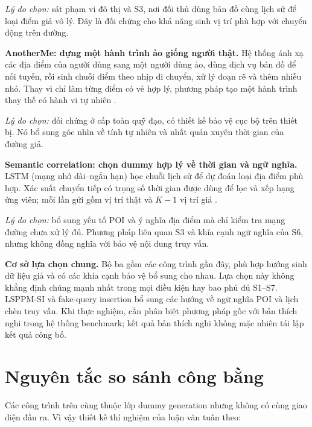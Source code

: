\documentclass[12pt,a4paper,oneside]{report}
\begin{document}
\noindent\emph{Lý do chọn:} sát phạm vi đô thị và S3, nơi đối thủ dùng bản đồ cùng lịch sử để loại điểm giả vô lý. Đây là đối chứng cho khả năng sinh vị trí phù hợp với chuyển động trên đường.

\medskip
\noindent\textbf{AnotherMe: dựng một hành trình ảo giống người thật.}
Hệ thống ánh xạ các địa điểm của người dùng sang một người dùng ảo, dùng dịch vụ bản đồ để nối tuyến, rồi sinh chuỗi điểm theo nhịp di chuyển, xử lý đoạn rẽ và thêm nhiễu nhỏ. Thay vì chỉ làm từng điểm có vẻ hợp lý, phương pháp tạo một hành trình thay thế có hành vi tự nhiên \citep{li2024anotherme,anothermecode}.

\noindent\emph{Lý do chọn:} đối chứng ở cấp toàn quỹ đạo, có thiết kế bảo vệ cục bộ trên thiết bị. Nó bổ sung góc nhìn về tính tự nhiên và nhất quán xuyên thời gian của đường giả.

\medskip
\noindent\textbf{Semantic correlation: chọn dummy hợp lý về thời gian và ngữ nghĩa.}
LSTM (mạng nhớ dài--ngắn hạn) học chuỗi lịch sử để dự đoán loại địa điểm phù hợp. Xác suất chuyển tiếp có trọng số thời gian được dùng để lọc và xếp hạng ứng viên; mỗi lần gửi gồm vị trí thật và $K-1$ vị trí giả \citep{liu2026semantic}.

\noindent\emph{Lý do chọn:} bổ sung yếu tố POI và ý nghĩa địa điểm mà chỉ kiểm tra mạng đường chưa xử lý đủ. Phương pháp liên quan S3 và khía cạnh ngữ nghĩa của S6, nhưng không đồng nghĩa với bảo vệ nội dung truy vấn.

\medskip
\noindent\textbf{Cơ sở lựa chọn chung.}
Bộ ba gồm các công trình gần đây, phù hợp hướng sinh dữ liệu giả và có các khía cạnh bảo vệ bổ sung cho nhau. Lựa chọn này không khẳng định chúng mạnh nhất trong mọi điều kiện hay bao phủ đủ S1--S7. LSPPM-SI và fake-query insertion bổ sung các hướng về ngữ nghĩa POI và lịch chèn truy vấn. Khi thực nghiệm, cần phân biệt phương pháp gốc với bản thích nghi trong hệ thống benchmark; kết quả bản thích nghi không mặc nhiên tái lập kết quả công bố.

\clearpage
\section{Nguyên tắc so sánh công bằng}

Các công trình trên cùng thuộc lớp dummy generation nhưng không có cùng giao diện đầu ra. Vì vậy thiết kế thí nghiệm của luận văn tuân theo:
\end{document}
